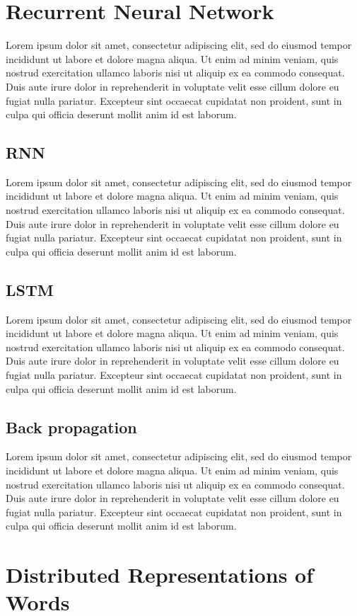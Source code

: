 \section{Recurrent Neural Network}
Lorem ipsum dolor sit amet, consectetur adipiscing elit, sed do eiusmod tempor incididunt ut labore et dolore magna aliqua. Ut enim ad minim veniam, quis nostrud exercitation ullamco laboris nisi ut aliquip ex ea commodo consequat. Duis aute irure dolor in reprehenderit in voluptate velit esse cillum dolore eu fugiat nulla pariatur. Excepteur sint occaecat cupidatat non proident, sunt in culpa qui officia deserunt mollit anim id est laborum.
\subsection{RNN}
Lorem ipsum dolor sit amet, consectetur adipiscing elit, sed do eiusmod tempor incididunt ut labore et dolore magna aliqua. Ut enim ad minim veniam, quis nostrud exercitation ullamco laboris nisi ut aliquip ex ea commodo consequat. Duis aute irure dolor in reprehenderit in voluptate velit esse cillum dolore eu fugiat nulla pariatur. Excepteur sint occaecat cupidatat non proident, sunt in culpa qui officia deserunt mollit anim id est laborum.
\subsection{LSTM}
Lorem ipsum dolor sit amet, consectetur adipiscing elit, sed do eiusmod tempor incididunt ut labore et dolore magna aliqua. Ut enim ad minim veniam, quis nostrud exercitation ullamco laboris nisi ut aliquip ex ea commodo consequat. Duis aute irure dolor in reprehenderit in voluptate velit esse cillum dolore eu fugiat nulla pariatur. Excepteur sint occaecat cupidatat non proident, sunt in culpa qui officia deserunt mollit anim id est laborum.
\subsection{Back propagation}
Lorem ipsum dolor sit amet, consectetur adipiscing elit, sed do eiusmod tempor incididunt ut labore et dolore magna aliqua. Ut enim ad minim veniam, quis nostrud exercitation ullamco laboris nisi ut aliquip ex ea commodo consequat. Duis aute irure dolor in reprehenderit in voluptate velit esse cillum dolore eu fugiat nulla pariatur. Excepteur sint occaecat cupidatat non proident, sunt in culpa qui officia deserunt mollit anim id est laborum.
\section{Distributed Representations of Words}

